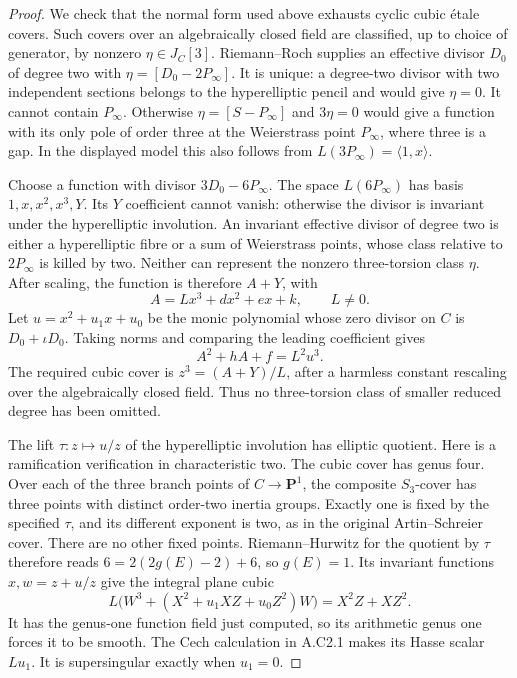 \begin{proof}
We check that the normal form used above exhausts cyclic cubic
\'etale covers. Such covers over an algebraically closed field are
classified, up to choice of generator, by nonzero
$\eta\in J_C[3]$. Riemann--Roch supplies an effective divisor
$D_0$ of degree two with $\eta=[D_0-2P_\infty]$. It is unique:
a degree-two divisor with two independent sections belongs to the
hyperelliptic pencil and would give $\eta=0$.
It cannot contain $P_\infty$. Otherwise
$\eta=[S-P_\infty]$ and $3\eta=0$ would give a function with
its only pole of order three at the Weierstrass point $P_\infty$,
where three is a gap. In the displayed model this also follows from
$L(3P_\infty)=\langle1,x\rangle$.

Choose a function with divisor $3D_0-6P_\infty$.
The space $L(6P_\infty)$ has basis $1,x,x^2,x^3,Y$.
Its $Y$ coefficient cannot vanish: otherwise the divisor is invariant
under the hyperelliptic involution. An invariant effective divisor of
degree two is either a hyperelliptic fibre or a sum of Weierstrass
points, whose class relative to $2P_\infty$ is killed by two.
Neither can represent the nonzero three-torsion class $\eta$.
After scaling, the function is therefore $A+Y$, with
\[
 A=Lx^3+dx^2+ex+k,\qquad L\ne0.
\]
Let $u=x^2+u_1x+u_0$ be the monic polynomial whose zero divisor on
$C$ is $D_0+\iota D_0$. Taking norms and comparing the leading
coefficient gives
\[
                     A^2+hA+f=L^2u^3.                       \tag{C2.5}
\]
The required cubic cover is $z^3=(A+Y)/L$, after a harmless
constant rescaling over the algebraically closed field. Thus no
three-torsion class of smaller reduced degree has been omitted.

The lift $\tau:z\mapsto u/z$ of the hyperelliptic involution has
elliptic quotient. Here is a ramification verification in
characteristic two. The cubic cover has genus four. Over each of
the three branch points of $C\to\mathbf P^1$, the composite
$S_3$-cover has three points with distinct order-two inertia groups.
Exactly one is fixed by the specified $\tau$, and its different
exponent is two, as in the original Artin--Schreier cover. There
are no other fixed points. Riemann--Hurwitz for the quotient by
$\tau$ therefore reads $6=2(2g(E)-2)+6$, so $g(E)=1$.
Its invariant functions $x,w=z+u/z$ give the integral plane cubic
\[
 L\bigl(W^3+(X^2+u_1XZ+u_0Z^2)W\bigr)=X^2Z+XZ^2.            \tag{C2.6}
\]
It has the genus-one function field just computed, so its arithmetic
genus one forces it to be smooth. The Cech calculation in A.C2.1
makes its Hasse scalar $Lu_1$. It is supersingular exactly when
$u_1=0$.


\end{proof}
